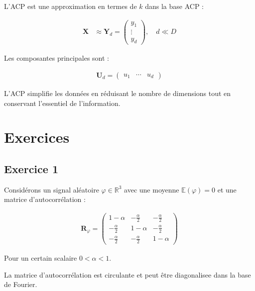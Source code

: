 \documentclass[12pt]{article}
\begin{document}
L'ACP est une approximation en termes de \( k \) dans la base ACP :

\begin{align}
\mathbf{X} &\approx \mathbf{Y}_d = \begin{pmatrix} y_1 \\ \vdots \\ y_d \end{pmatrix}, \quad d \ll D
\end{align}

Les composantes principales sont :

\begin{align}
\mathbf{U}_d = \begin{pmatrix} u_1 & \cdots & u_d \end{pmatrix}
\end{align}

\begin{tcolorbox}[title={Vulgarisation simple}]
L'ACP simplifie les données en réduisant le nombre de dimensions tout en conservant l'essentiel de l'information.
\end{tcolorbox}

\newpage

\section{Exercices}

\subsection{Exercice 1}

Considérons un signal aléatoire \( \varphi \in \mathbb{R}^3 \) avec une moyenne \( \mathbb{E}(\varphi) = 0 \) et une matrice d'autocorrélation :

\begin{align}
\mathbf{R}_\varphi = \begin{pmatrix} 1-\alpha & -\frac{\alpha}{2} & -\frac{\alpha}{2} \\ -\frac{\alpha}{2} & 1-\alpha & -\frac{\alpha}{2} \\ -\frac{\alpha}{2} & -\frac{\alpha}{2} & 1-\alpha \end{pmatrix}
\end{align}

Pour un certain scalaire \( 0 < \alpha < 1 \).

\begin{tcolorbox}[title={Intuition}]
La matrice d'autocorrélation est circulante et peut être diagonalisee dans la base de Fourier.
\end{tcolorbox}
\end{document}
